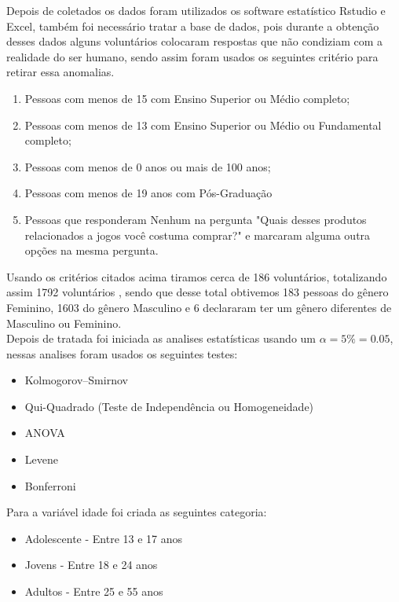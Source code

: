 \documentclass[11pt,a4paper]{article}
\begin{document}
Depois de coletados os dados foram utilizados os software estatístico Rstudio e Excel, também foi necessário tratar a base de dados, pois durante a obtenção desses dados alguns voluntários colocaram respostas que não condiziam com a realidade do ser humano, sendo assim foram usados os seguintes critério para retirar essa anomalias.
 \begin{enumerate}[label=(\roman*)]
\item Pessoas com menos de 15 com Ensino Superior ou Médio completo; 
\item Pessoas com menos de 13 com  Ensino Superior ou Médio  ou Fundamental completo;
\item Pessoas com menos de 0 anos ou mais de 100 anos;
\item Pessoas com menos de 19 anos com Pós-Graduação
\item Pessoas que responderam Nenhum na pergunta "Quais desses produtos relacionados a jogos você costuma comprar?"  e marcaram alguma outra opções na mesma pergunta.
\end{enumerate}
Usando os critérios citados acima tiramos cerca de 186 voluntários, totalizando assim 1792 voluntários , sendo que desse total obtivemos 183 pessoas do gênero Feminino, 1603 do gênero Masculino e 6 declararam ter um gênero diferentes de Masculino  ou Feminino. 
\\

Depois de tratada foi iniciada as analises estatísticas usando um $\alpha=5\%=0.05$, nessas analises foram usados os seguintes testes:
\newline

\begin{itemize}[noitemsep,nolistsep]
\item Kolmogorov–Smirnov
\item Qui-Quadrado (Teste de Independência ou Homogeneidade)
\item ANOVA
\item Levene
\item Bonferroni
\end{itemize}

Para a variável idade foi criada as seguintes categoria:
\newline

\begin{itemize}[noitemsep,nolistsep]
\item Adolescente - Entre  13 e 17 anos
\item Jovens - Entre 18 e 24 anos
\item Adultos - Entre 25 e 55 anos
\end{itemize}
\end{document}
